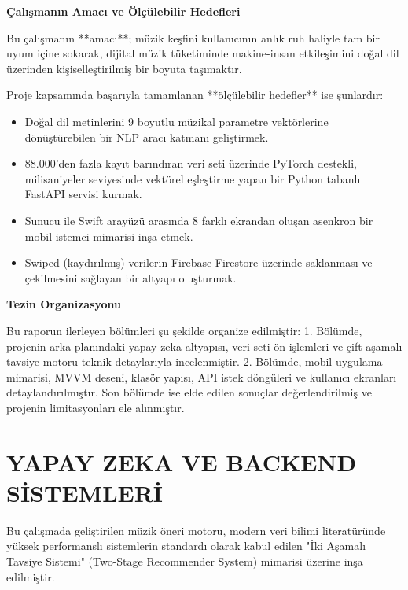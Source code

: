\documentclass[12pt, a4paper]{report}
\begin{document}
\vspace{0.5cm}
\noindent\textbf{Çalışmanın Amacı ve Ölçülebilir Hedefleri}

Bu çalışmanın **amacı**; müzik keşfini kullanıcının anlık ruh haliyle tam bir uyum içine sokarak, dijital müzik tüketiminde makine-insan etkileşimini doğal dil üzerinden kişiselleştirilmiş bir boyuta taşımaktır.

Proje kapsamında başarıyla tamamlanan **ölçülebilir hedefler** ise şunlardır:
\begin{itemize}
  \item Doğal dil metinlerini 9 boyutlu müzikal parametre vektörlerine dönüştürebilen bir NLP aracı katmanı geliştirmek.
  \item 88.000'den fazla kayıt barındıran veri seti üzerinde PyTorch destekli, milisaniyeler seviyesinde vektörel eşleştirme yapan bir Python tabanlı FastAPI servisi kurmak.
  \item Sunucu ile Swift arayüzü arasında 8 farklı ekrandan oluşan asenkron bir mobil istemci mimarisi inşa etmek.
  \item Swiped (kaydırılmış) verilerin Firebase Firestore üzerinde saklanması ve çekilmesini sağlayan bir altyapı oluşturmak.
\end{itemize}

\vspace{0.5cm}
\noindent\textbf{Tezin Organizasyonu}

Bu raporun ilerleyen bölümleri şu şekilde organize edilmiştir: 1. Bölümde, projenin arka planındaki yapay zeka altyapısı, veri seti ön işlemleri ve çift aşamalı tavsiye motoru teknik detaylarıyla incelenmiştir. 2. Bölümde, mobil uygulama mimarisi, MVVM deseni, klasör yapısı, API istek döngüleri ve kullanıcı ekranları detaylandırılmıştır. Son bölümde ise elde edilen sonuçlar değerlendirilmiş ve projenin limitasyonları ele alınmıştır.

\chapter{YAPAY ZEKA VE BACKEND SİSTEMLERİ}

Bu çalışmada geliştirilen müzik öneri motoru, modern veri bilimi literatüründe yüksek performanslı sistemlerin standardı olarak kabul edilen "İki Aşamalı Tavsiye Sistemi" (Two-Stage Recommender System) mimarisi üzerine inşa edilmiştir.
\end{document}
